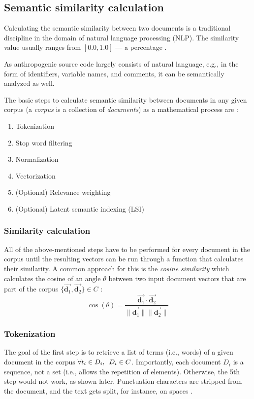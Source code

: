 \documentclass[12pt,a4paper]{report}
\begin{document}
\subsection{Semantic similarity calculation} \label{subsect:semantic-similarity}

Calculating the semantic similarity between two documents is a traditional
discipline in the domain of natural language processing (NLP). The similarity
value usually ranges from \([0.0, 1.0]\) --- a percentage \cite{singhal2001ir}.

As anthropogenic source code largely consists of natural language, e.g., in
the form of identifiers, variable names, and comments, it can be semantically
analyzed as well.

The basic steps to calculate semantic similarity between documents in any given
corpus (a \textit{corpus} is a collection of \textit{documents}) as a
mathematical process are \cite{singhal2001ir}:
\begin{enumerate}
  \item Tokenization
  \item Stop word filtering
  \item Normalization
  \item Vectorization
  \item (Optional) Relevance weighting
  \item (Optional) Latent semantic indexing (LSI)
\end{enumerate}


\subsubsection{Similarity calculation}
All of the above-mentioned steps have to
be performed for every document in the corpus until the resulting vectors can
be run through a function that calculates their similarity. A common approach
for this is the \textit{cosine similarity} which calculates the cosine of an
angle \(\theta\) between two input document vectors that are part of the corpus
\(\{\vec{\mathbf d_1}, \vec{\mathbf d_2}\} \in C\) \cite{singhal2001ir}:
\[
  \cos(\theta) = \frac{
    \vec{\mathbf d_1} \cdot \vec{\mathbf d_2}
  }{
    \|\vec{\mathbf d_1} \|\|\vec{\mathbf d_2} \|
  }
\]


\subsubsection{Tokenization}
The goal of the first step is to retrieve a list
of terms (i.e., words) of a given document in the corpus
\(\forall t_i \in D_i, \enskip D_i \in C\).
Importantly, each document \(D_i\) is a sequence, not a
set (i.e., allows the repetition of elements). Otherwise, the 5th step would
not work, as shown later. Punctuation characters are stripped
from the document, and the text gets split, for instance, on spaces \cite{singhal2001ir}.
\end{document}
